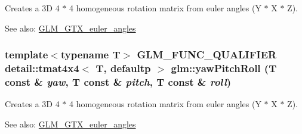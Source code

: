 Creates a 3D 4 $\ast$ 4 homogeneous rotation matrix from euler angles (Y $\ast$ X $\ast$ Z). \begin{Desc}
\item[See also:]\hyperlink{group__gtx__euler__angles}{GLM\_\-GTX\_\-euler\_\-angles} \end{Desc}
\hypertarget{group__gtx__euler__angles_ga254d26a7a42b65101f4eee88d5b153f}{
\subsubsection[yawPitchRoll]{\setlength{\rightskip}{0pt plus 5cm}template$<$typename T$>$ GLM\_\-FUNC\_\-QUALIFIER detail::tmat4x4$<$ T, defaultp $>$ glm::yawPitchRoll (T const \& {\em yaw}, \/  T const \& {\em pitch}, \/  T const \& {\em roll})}}
\label{group__gtx__euler__angles_ga254d26a7a42b65101f4eee88d5b153f}


Creates a 3D 4 $\ast$ 4 homogeneous rotation matrix from euler angles (Y $\ast$ X $\ast$ Z). \begin{Desc}
\item[See also:]\hyperlink{group__gtx__euler__angles}{GLM\_\-GTX\_\-euler\_\-angles} \end{Desc}
